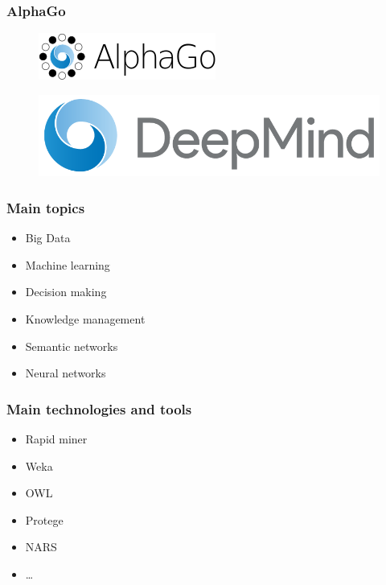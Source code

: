 \documentclass[12pt, aspectratio=169]{beamer}
\begin{document}
\begin{frame}
\frametitle{AlphaGo}
\begin{figure}
  \includegraphics[width=0.45\linewidth]{220px-Alphago.png}
\end{figure}
\begin{figure}
  \includegraphics[width=0.45\linewidth]{DeepMind_logo.png}
\end{figure}
\end{frame}
\begin{frame}
\frametitle{Main topics}
\begin{itemize}
\item Big Data
\item Machine learning
\item Decision making
\item Knowledge management
\item Semantic networks
\item Neural networks
\end{itemize}
\end{frame}
\begin{frame}
\frametitle{Main technologies and tools}
\begin{itemize}
\item Rapid miner
\item Weka
\item OWL
\item Protege
\item NARS
\item \ldots
\end{itemize}
\end{frame}
\end{document}
